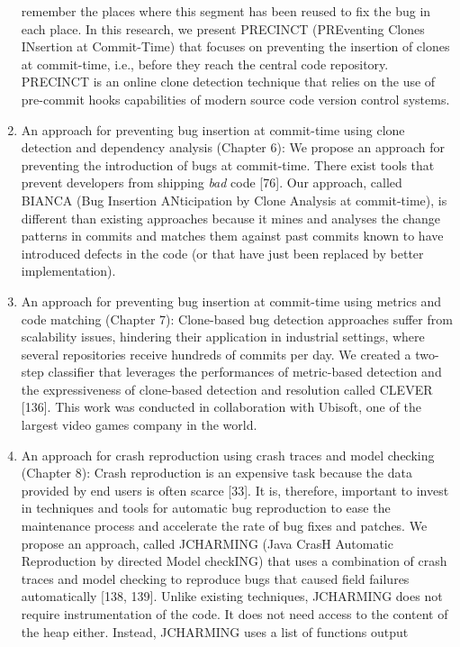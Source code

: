 \documentclass[12pt]{report}
\begin{document}
\begin{enumerate}
  remember the places where this segment has been reused to fix the bug
  in each place. In this research, we present PRECINCT (PREventing
  Clones INsertion at Commit-Time) that focuses on preventing the
  insertion of clones at commit-time, i.e., before they reach the
  central code repository. PRECINCT is an online clone detection
  technique that relies on the use of pre-commit hooks capabilities of
  modern source code version control systems.
\item
  An approach for preventing bug insertion at commit-time using clone
  detection and dependency analysis (Chapter 6): We propose an approach
  for preventing the introduction of bugs at commit-time. There exist
  tools that prevent developers from shipping \emph{bad} code {[}76{]}.
  Our approach, called BIANCA (Bug Insertion ANticipation by Clone
  Analysis at commit-time), is different than existing approaches
  because it mines and analyses the change patterns in commits and
  matches them against past commits known to have introduced defects in
  the code (or that have just been replaced by better implementation).
\item
  An approach for preventing bug insertion at commit-time using metrics
  and code matching (Chapter 7): Clone-based bug detection approaches
  suffer from scalability issues, hindering their application in
  industrial settings, where several repositories receive hundreds of
  commits per day. We created a two-step classifier that leverages the
  performances of metric-based detection and the expressiveness of
  clone-based detection and resolution called CLEVER {[}136{]}. This
  work was conducted in collaboration with Ubisoft, one of the largest
  video games company in the world.
\item
  An approach for crash reproduction using crash traces and model
  checking (Chapter 8): Crash reproduction is an expensive task because
  the data provided by end users is often scarce {[}33{]}. It is,
  therefore, important to invest in techniques and tools for automatic
  bug reproduction to ease the maintenance process and accelerate the
  rate of bug fixes and patches. We propose an approach, called
  JCHARMING (Java CrasH Automatic Reproduction by directed Model
  checkING) that uses a combination of crash traces and model checking
  to reproduce bugs that caused field failures automatically {[}138,
  139{]}. Unlike existing techniques, JCHARMING does not require
  instrumentation of the code. It does not need access to the content of
  the heap either. Instead, JCHARMING uses a list of functions output

\end{enumerate}
\end{document}
